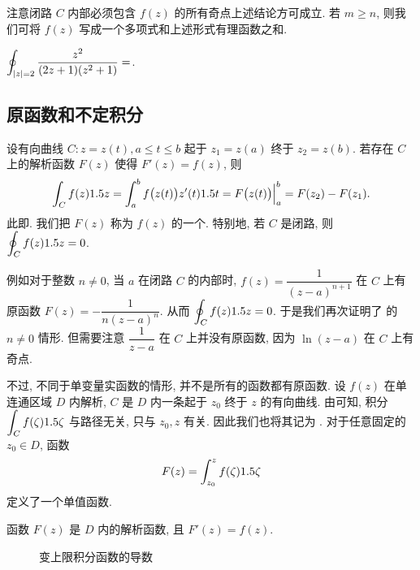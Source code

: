 注意闭路 $C$ 内部必须包含 $f(z)$ 的所有奇点上述结论方可成立.
若 $m\ge n$, 则我们可将 $f(z)$ 写成一个多项式和上述形式有理函数之和.

\begin{exercise}
  $\displaystyle\oint_{\lvert z\rvert=2}\frac{z^2}{(2z+1)(z^2+1)}=$\fillblank{}.
\end{exercise}


\subsection{原函数和不定积分}

设有向曲线 $C:z=z(t),a\le t\le b$ 起于 $z_1=z(a)$ 终于 $z_2=z(b)$.
若存在 $C$ 上的解析函数 $F(z)$ 使得 $F'(z)=f(z)$, 则
\begin{equation}
  \label{eq:newton-leibniz}
   \int_C f(z)1.5 z
  =\int_a^b f\bigl(z(t)\bigr)z'(t)1.5 t
  =F\bigl(z(t)\bigr)\Big|_a^b
  =F(z_2)-F(z_1).
\end{equation}
此即.
我们把 $F(z)$ 称为 $f(z)$ 的一个.
特别地, 若 $C$ 是闭路, 则 $\displaystyle\oint_C f(z)1.5 z=0$.

例如对于整数 $n\neq0$, 当 $a$ 在闭路 $C$ 的内部时, $f(z)=\dfrac1{(z-a)^{n+1}}$ 在 $C$ 上有原函数 $F(z)=-\dfrac1{n(z-a)^n}$.
从而 $\displaystyle\oint_C f(z)1.5 z=0$. 
于是我们再次证明了 的 $n\neq0$ 情形.
但需要注意 $\dfrac1{z-a}$ 在 $C$ 上并没有原函数, 因为 $\ln(z-a)$ 在 $C$ 上有奇点.

不过, 不同于单变量实函数的情形, 并不是所有的函数都有原函数.
设 $f(z)$ 在单连通区域 $D$ 内解析, $C$ 是 $D$ 内一条起于 $z_0$ 终于 $z$ 的有向曲线.
由\thmCG 可知, 积分 $\displaystyle\int_C f(\zeta)1.5 \zeta$ 与路径无关, 只与 $z_0,z$ 有关.
因此我们也将其记为 .
对于任意固定的 $z_0\in D$, 函数
\[
  F(z)=\int_{z_0}^zf(\zeta)1.5\zeta
\]
定义了一个单值函数.

\begin{theorem}
  \label{thm:primitive-function}
  函数 $F(z)$ 是 $D$ 内的解析函数, 且 $F'(z)=f(z)$.
\end{theorem}

\begin{figure}[H]
  \centering
  \caption{变上限积分函数的导数}
\end{figure}

